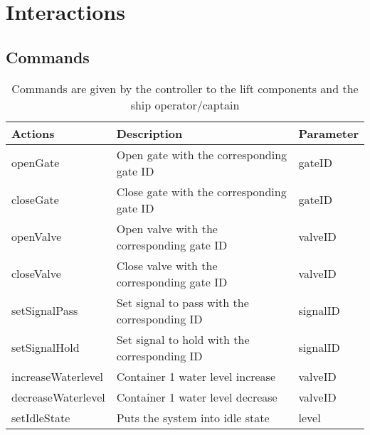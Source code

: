 \section{Interactions}

\subsection{Commands}
\begin{table}[htbp]
	\centering
	\caption{Commands are given by the controller to the lift components and the ship operator/captain}
	\begin{tabular}{lll}
		\toprule
		\textbf{Actions} & \textbf{Description} & \textbf{Parameter} \\
		\midrule
		openGate & Open gate with the corresponding gate ID & gateID \\
		closeGate & Close gate with the corresponding gate ID & gateID \\
		openValve & Open valve with the corresponding gate ID & valveID \\
		closeValve & Close valve with the corresponding gate ID & valveID \\
		setSignalPass & Set signal to pass with the corresponding ID  & signalID \\
		setSignalHold & Set signal to hold with the corresponding ID  & signalID \\
		increaseWaterlevel & Container 1 water level increase & valveID \\
		decreaseWaterlevel & Container 1 water level decrease & valveID \\
		setIdleState & Puts the system into idle state & level \\ %
		\bottomrule
		\end{tabular}%
		\label{tab:addlabel}%
		\end{table}%
		
